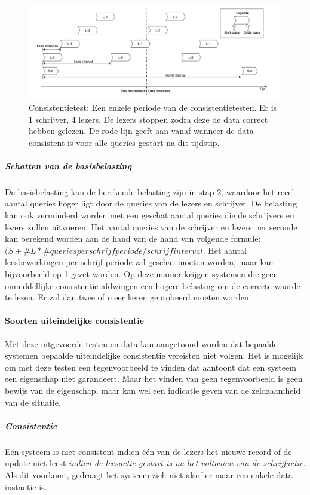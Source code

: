 \begin{figure}[ht!]
\centering
\includegraphics[width=\linewidth]{img/Consistentie-test-periode}
\caption{Consistentietest: Een enkele periode van de consistentietesten. Er is 1 schrijver, 4 lezers. De lezers stoppen zodra deze de data correct hebben gelezen. De rode lijn geeft aan vanaf wanneer de data consistent is voor alle queries gestart na dit tijdstip. }
\label{fig:test-consistentietest-periode}
\end{figure}


\subparagraph{Schatten van de basisbelasting} De basisbelasting kan de berekende belasting zijn in stap 2, waardoor het reëel aantal queries hoger ligt door de queries van de lezers en schrijver. De belasting kan ook verminderd worden met een geschat aantal queries die de schrijvers en lezers zullen uitvoeren. Het aantal queries van de schrijver en lezers per seconde kan berekend worden aan de hand van de hand van volgende formule: $(S + \#L*\#queriesperschrijfperiode / schrijfinterval$. Het aantal leesbewerkingen per schrijf periode zal geschat moeten worden, maar kan bijvoorbeeld op 1 gezet worden. Op deze manier krijgen systemen die geen onmiddellijke consistentie afdwingen een hogere belasting om de correcte waarde te lezen. Er zal dan twee of meer keren geprobeerd moeten worden. 

\paragraph{Soorten uiteindelijke consistentie} Met deze uitgevoerde testen en data kan aangetoond worden dat bepaalde systemen bepaalde uiteindelijke consistentie vereisten niet volgen. Het is mogelijk om met deze testen een tegenvoorbeeld te vinden dat aantoont dat een systeem een eigenschap niet garandeert. Maar het vinden van geen tegenvoorbeeld is geen bewijs van de eigenschap, maar kan wel een indicatie geven van de zeldzaamheid van de situatie. 

\subparagraph{Consistentie} Een systeem is niet consistent indien één van de lezers het nieuwe record of de update niet leest \textit{indien de leesactie gestart is na het voltooien van de schrijfactie}. Als dit voorkomt, gedraagt het systeem zich niet alsof er maar een enkele data-instantie is. 

